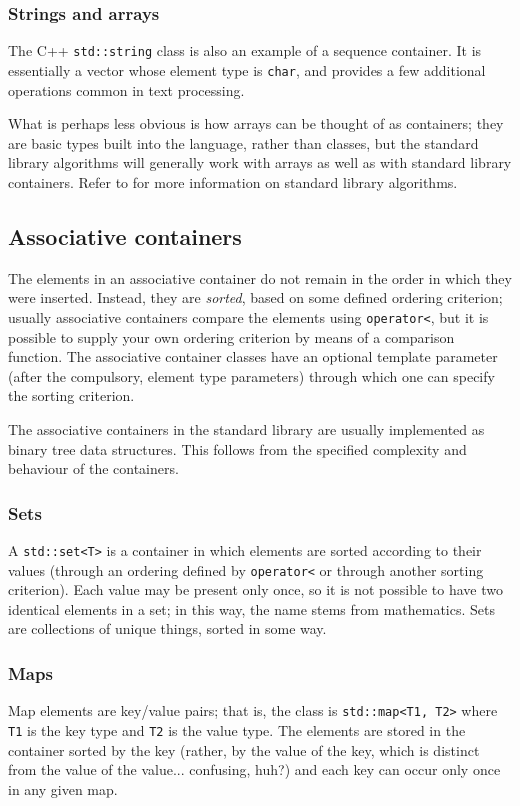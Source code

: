 \documentclass[a4paper]{scrartcl}
\begin{document}
\subsubsection{Strings and arrays}\label{sec:containers_sequence_strings_arrays}
The C++ \verb|std::string| class is also an example of a sequence container. It is essentially a vector whose element type is \verb|char|, and provides a few additional operations common in text processing.

What is perhaps less obvious is how arrays can be thought of as containers; they are basic types built into the language, rather than classes, but the standard library algorithms will generally work with arrays as well as with standard library containers. Refer to\cite{StandardLibrary} for more information on standard library algorithms.

\subsection{Associative containers}\label{sec:containers_associative}
The elements in an associative container do not remain in the order in which they were inserted. Instead, they are \emph{sorted}, based on some defined ordering criterion; usually associative containers compare the elements using \verb|operator<|, but it is possible to supply your own ordering criterion by means of a comparison function. The associative container classes have an optional template parameter (after the compulsory, element type parameters) through which one can specify the sorting criterion.

The associative containers in the standard library are usually implemented as binary tree data structures. This follows from the specified complexity and behaviour of the containers.

\subsubsection{Sets}\label{sec:containers_associative_set}
A \verb|std::set<T>| is a container in which elements are sorted according to their values (through an ordering defined by \verb|operator<| or through another sorting criterion). Each value may be present only once, so it is not possible to have two identical elements in a set; in this way, the name stems from mathematics. Sets are collections of unique things, sorted in some way.

\subsubsection{Maps}\label{sec:containers_associative_map}
Map elements are key/value pairs; that is, the class is \verb|std::map<T1, T2>| where \verb|T1| is the key type and \verb|T2| is the value type. The elements are stored in the container sorted by the key (rather, by the value of the key, which is distinct from the value of the value... confusing, huh?) and each key can occur only once in any given map.
\end{document}
